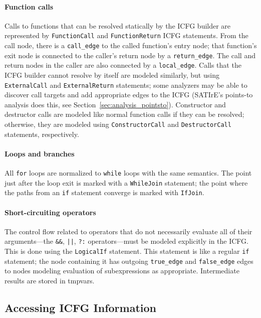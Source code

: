 \documentclass[a4paper,12pt]{report}
\begin{document}
\paragraph{Function calls} Calls to functions that can be resolved
statically by the ICFG builder are represented by \verb|FunctionCall| and
\verb|FunctionReturn| ICFG statements. From the call node, there is a
\verb|call_edge| to the called function's entry node; that function's exit
node is connected to the caller's return node by a \verb|return_edge|. The
call and return nodes in the caller are also connected by a
\verb|local_edge|. Calls that the ICFG builder cannot resolve by itself are
modeled similarly, but using \verb|ExternalCall| and \verb|ExternalReturn|
statements; some analyzers may be able to discover call targets and add
appropriate edges to the ICFG (SATIrE's points-to analysis does this, see
Section~\ref{sec:analysis_pointsto}). Constructor and destructor calls are
modeled like normal function calls if they can be resolved; otherwise, they
are modeled using \verb|ConstructorCall| and \verb|DestructorCall|
statements, respectively.

\paragraph{Loops and branches} All \verb|for| loops are normalized to
\verb|while| loops with the same semantics. The point just after the loop
exit is marked with a \verb|WhileJoin| statement; the point where the paths
from an \verb|if| statement converge is marked with \verb|IfJoin|.

\paragraph{Short-circuiting operators} The control flow related to operators
that do not necessarily evaluate all of their arguments---the \verb|&&|,
\verb&||&, \verb|?:| operators---must be modeled explicitly in the ICFG.
This is done using the \verb|LogicalIf| statement. This statement is like a
regular \verb|if| statement; the node containing it has outgoing
\verb|true_edge| and \verb|false_edge| edges to nodes modeling evaluation of
subexpressions as appropriate. Intermediate results are stored in tmpvars.

\subsection{Accessing ICFG Information}
\label{sec:icfg_information}
\end{document}
